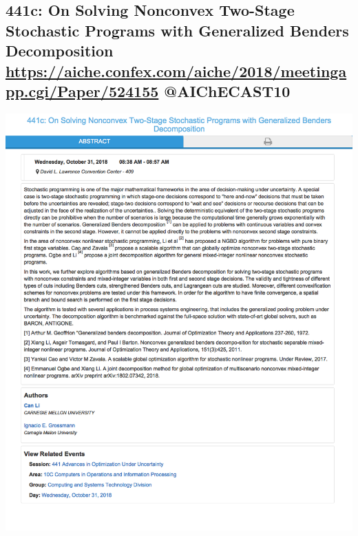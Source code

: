 \documentclass[11pt]{article}
\begin{document}
\subsection{441c: On Solving Nonconvex Two-Stage Stochastic Programs with Generalized Benders Decomposition \url{https://aiche.confex.com/aiche/2018/meetingapp.cgi/Paper/524155} @AIChECAST10}
\label{sec:org04cf667}
\begin{center}
\includegraphics[width=.9\linewidth]{./524155.png}
\end{center}
\end{document}
